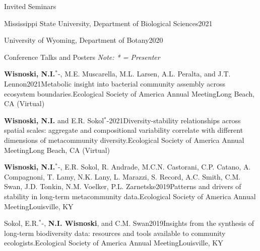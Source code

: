 \documentclass{resume} %
\newcommand{\Star}{\ensuremath{^*}\kern-\scriptspace}
\begin{document}
\bigskip
\begin{rSection}{Invited Seminars}
\begin{Seminar}{Mississippi State University, Department of Biological Sciences}{2021}\end{Seminar}
\begin{Seminar}{University of Wyoming, Department of Botany}{2020}\end{Seminar}
\end{rSection}

\bigskip
\begin{rhangSection}{Conference Talks and Posters}
\emph{\small Note: * = Presenter}

    \begin{Presentation}{{\bf Wisnoski, N.I.}\Star, M.E. Muscarella, M.L. Larsen, A.L. Peralta, and J.T. Lennon}{2021}{Metabolic insight into bacterial community assembly across ecosystem boundaries.}{Ecological Society of America Annual Meeting}{Long Beach, CA (Virtual)}
    \end{Presentation}
    
    \begin{Presentation}{{\bf Wisnoski, N.I.} and E.R. Sokol\Star}{2021}{Diversity-stability relationships across spatial scales: aggregate and compositional variability correlate with different dimensions of metacommunity diversity.}{Ecological Society of America Annual Meeting}{Long Beach, CA (Virtual)}
    \end{Presentation}

    \begin{Presentation}{{\bf Wisnoski, N.I.}\Star, E.R. Sokol, R. Andrade, M.C.N. Castorani, C.P. Catano, A. Compagnoni, T. Lamy, N.K. Lany, L. Marazzi, S. Record, A.C. Smith, C.M. Swan, J.D. Tonkin, N.M. Voelker, P.L. Zarnetske}{2019}{Patterns and drivers of stability in long-term metacommunity data.}{Ecological Society of America Annual Meeting}{Louisville, KY}
  \end{Presentation}
  
  \begin{Presentation}{Sokol, E.R.\Star, {\bf N.I. Wisnoski}, and C.M. Swan}{2019}{Insights from the synthesis of long-term biodiversity data: resources and tools available to community ecologists.}{Ecological Society of America Annual Meeting}{Louisville, KY}
  \end{Presentation}
  

\end{rhangSection}
\end{document}
